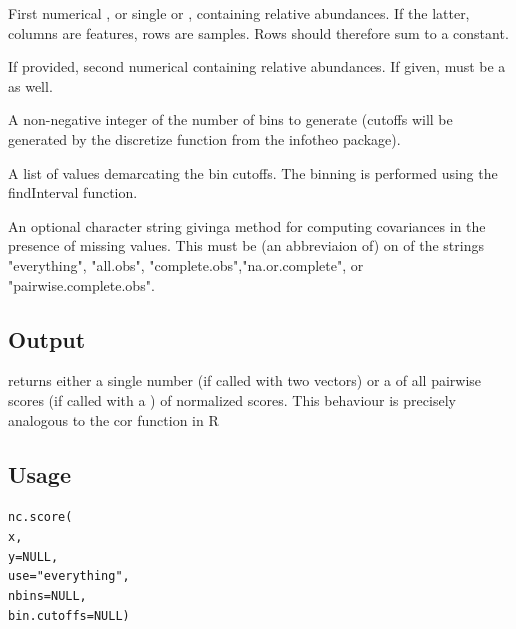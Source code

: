 \documentclass{article}\usepackage[]{graphicx}\usepackage[usenames,dvipsnames]{color}
\newcommand{\hlstr}[1]{\textcolor[rgb]{0.251,0.627,0.251}{#1}}%
\newcommand{\hlstd}[1]{\textcolor[rgb]{0.251,0.251,0.251}{#1}}%
\newcommand{\hlkwa}[1]{\textcolor[rgb]{0.125,0.125,0.941}{#1}}%
\newcommand{\hlkwc}[1]{\textcolor[rgb]{0.251,0.251,0.251}{#1}}%
\newcommand{\hlkwd}[1]{\textcolor[rgb]{0.878,0.439,0.125}{#1}}%
\newenvironment{knitrout}{}{} %
\begin{document}
\begin{description}
\setlength{\itemsep}{1em}

\item[\Rcode{x}]
First numerical , or single  or , containing relative abundances.  If the latter, columns are features, rows are samples.  Rows should therefore sum to a constant.

\item[\Rcode{y}]
If provided, second numerical  containing relative abundances.  If given,  must be a  as well.

\item[\Rcode{nbins}]
A non-negative integer of the number of bins to generate (cutoffs will be generated by the discretize function from the infotheo package).
 
\item[\Rcode{bin.cutoffs}]
A list of values demarcating the bin cutoffs.  The binning is   performed using the findInterval function.

\item[\Rcode{use}]
An optional character string givinga method for computing covariances    in the presence of missing values.  This must be (an abbreviaion of) on of the strings "everything", "all.obs", "complete.obs","na.or.complete", or "pairwise.complete.obs".

\end{description}

\subsection{Output}

 returns either a single number (if called with two vectors) or a  of all pairwise scores (if called with a ) of normalized scores.
This behaviour is precisely analogous to the cor function in R


\subsection{Usage}

\begin{knitrout}
\color{fgcolor}\begin{kframe}
\begin{alltt}
\hlkwd{nc.score}\hlstd{(}
 \hlstd{x,}
 \hlkwc{y} \hlstd{=} \hlkwa{NULL}\hlstd{,}
 \hlkwc{use} \hlstd{=} \hlstr{"everything"}\hlstd{,}
 \hlkwc{nbins} \hlstd{=} \hlkwa{NULL}\hlstd{,}
 \hlkwc{bin.cutoffs}\hlstd{=}\hlkwa{NULL}\hlstd{)}
\end{alltt}
\end{kframe}
\end{knitrout}
\end{document}
